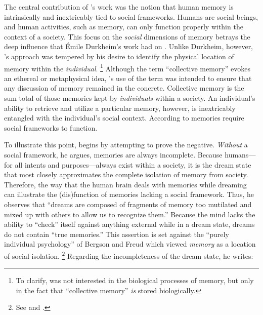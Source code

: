 The central contribution of \halbwachs's work was the notion that human memory is intrinsically and inextricably tied to social frameworks.%
    \autocite[37--38]{halbwachs1992}
Humans are social beings, and human activities, such as memory, can only function properly within the context of a society. This focus on the \emph{social} dimensions of memory betrays the deep influence that Émile Durkheim's work had on \halbwachs.%
    \autocite[8--9]{coser_halbwachs1992}
Unlike Durkheim, however, \halbwachs's approach was tempered by his desire to identify the physical location of memory within the \emph{individual}.%
    \footnote{%
        To clarify, \halbwachs was not  interested in the biological processes of memory, but only in the fact that ``collective memory'' \emph{is} stored biologically.}
%
Although the term ``collective memory'' evokes an ethereal or metaphysical idea, \halbwachs's use of the term was intended to ensure that any discussion of memory remained in the concrete. Collective memory is the sum total of those memories kept by \emph{individuals} within a society. An individual's ability to retrieve and utilize a particular memory, however, is inextricably entangled with the individual's social context. According to \halbwachs memories require social frameworks to function.%
    \autocite[38]{halbwachs1992}  

To illustrate this point, \halbwachs begins  by attempting to prove the negative. \emph{Without} a social framework, he argues, memories are always incomplete. Because humans---for all intents and purposes---always exist within a society, it is the dream state that most closely approximates the complete isolation of memory from society.%
    \autocite[41--42]{halbwachs1992}
Therefore, the way that the human brain deals with memories while dreaming can illustrate the (dis)function of memories lacking a social framework. Thus, he observes that ``dreams are composed of fragments of memory too mutilated and mixed up with others to allow us to recognize them.''%
    \autocite[41]{halbwachs1992}
Because the mind lacks the ability to ``check'' itself against anything external while in a dream state, dreams do not contain ``true memories.''%
    \autocite[41]{halbwachs1992}
This assertion is set against the ``purely individual psychology'' of Bergson and Freud which viewed \emph{memory} as a location of social isolation.%
    \footnote{%
        See 
        \cite{ansellpearson_radstone-schwarz2011} and 
        \cite{terdiman_radstone-schwarz2011}.}
Regarding the incompleteness of the dream state, he writes:  


